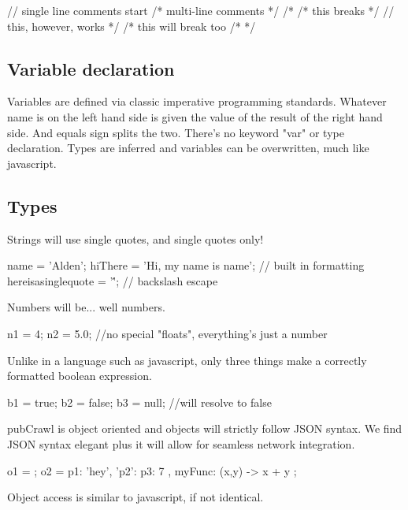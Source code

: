 \documentclass[letterpaper]{article}
\begin{document}
\begin{mdframed}
[hidealllines=true,backgroundcolor=gray!10,skipbelow=1em,skipabove=.5em]
\begin{code}
// single line comments start 
/*
	multi-line comments
*/
/*
	/* this breaks */
	// this, however, works
*/
/* this will break too /* */
\end{code}
\end{mdframed}

\subsection{Variable declaration}

Variables are defined via classic imperative programming standards. Whatever name is on the left hand side is given the value of the result of the right hand side. And equals sign splits the two. There's no keyword "var" or type declaration. Types are inferred and variables can be overwritten, much like javascript.

\subsection{Types}

Strings will use single quotes, and single quotes only!

\begin{mdframed}[hidealllines=true,backgroundcolor=gray!10,skipbelow=1em,skipabove=.5em]
\begin{code}
name = 'Alden';
hiThere = 'Hi, my name is {{name}}'; // built in formatting
hereisasinglequote = '\''; // backslash escape
\end{code}
\end{mdframed} 
Numbers will be... well numbers.
\begin{mdframed}[hidealllines=true,backgroundcolor=gray!10,skipbelow=1em,skipabove=.5em]
\begin{code}
n1 = 4;  
n2 = 5.0; //no special "floats", everything's just a number
\end{code}
\end{mdframed}
Unlike in a language such as javascript, only three things make a correctly formatted boolean expression.
\begin{mdframed}[hidealllines=true,backgroundcolor=gray!10,skipbelow=1em,skipabove=.5em]
\begin{code}
b1 = true;
b2 = false;
b3 = null; //will resolve to false
\end{code}
\end{mdframed}
pubCrawl is object oriented and objects will strictly follow JSON syntax. We find JSON syntax elegant plus it will allow for seamless network integration.
\begin{mdframed}[hidealllines=true,backgroundcolor=gray!10,skipbelow=1em,skipabove=.5em]
\begin{code}
o1 = {}; 
o2 = {
	p1: 'hey',
	'p2': {
		p3: 7
	},
	myFunc: (x,y) -> x + y
};
\end{code}
\end{mdframed}
Object access is similar to javascript, if not identical.
\end{document}
